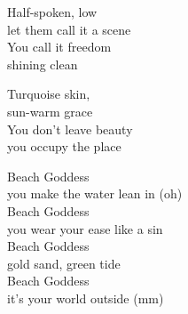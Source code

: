 \begin{lyrics}
Half-spoken, low\\
let them call it a scene\\
You call it freedom\\
shining clean

Turquoise skin,\\
sun-warm grace\\
You don’t leave beauty\\
you occupy the place

Beach Goddess\\
you make the water lean in (oh)\\
Beach Goddess\\
you wear your ease like a sin\\
Beach Goddess\\
gold sand, green tide\\
Beach Goddess\\
it’s your world outside (mm)
\end{lyrics}

